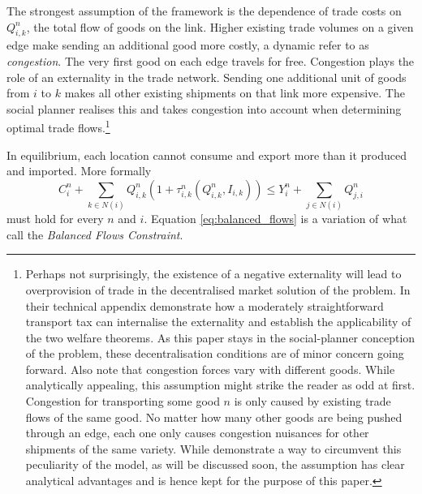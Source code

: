 \documentclass[11pt, oneside]{article}   	%
\begin{document}
The strongest assumption of the \citeauthor{Fajgelbaum_OptimalTransportNetworks_2017} framework is the dependence of trade costs on $Q_{i,k}^{n}$, the total flow of goods on the link. Higher existing trade volumes on a given edge make sending an additional good more costly, a dynamic \citeauthor{Fajgelbaum_OptimalTransportNetworks_2017} refer to as \emph{congestion}. The very first good on each edge travels for free. Congestion plays the role of an externality in the trade network. Sending one additional unit of goods from $i$ to $k$ makes all other existing shipments on that link more expensive. The social planner realises this and takes congestion into account when determining optimal trade flows.\footnote{Perhaps not surprisingly, the existence of a negative externality will lead to overprovision of trade in the decentralised market solution of the problem. In their technical appendix \citeauthor{Fajgelbaum_OptimalTransportNetworks_2017} demonstrate how a moderately straightforward transport tax can internalise the externality and establish the applicability of the two welfare theorems. As this paper stays in the social-planner conception of the problem, these decentralisation conditions are of minor concern going forward. Also note that congestion forces vary with different goods. While analytically appealing, this assumption might strike the reader as odd at first. Congestion for transporting some good $n$ is only caused by existing trade flows of the same good. No matter how many other goods are being pushed through an edge, each one only causes congestion nuisances for other shipments of the same variety. While \citeauthor{Fajgelbaum_OptimalTransportNetworks_2017} demonstrate a way to circumvent this peculiarity of the model, as will be discussed soon, the assumption has clear analytical advantages and is hence kept for the purpose of this paper.}

In equilibrium, each location cannot consume and export more than it produced and imported. More formally
\begin{equation}
  C_{i}^{n} + \sum_{k\in N(i)}^{}Q_{i,k}^{n}(1+\tau_{i,k}^{n}(Q_{i,k}^{n}, I_{i,k})) \leq Y_{i}^{n} + \sum_{j\in N(i)}^{}Q_{j,i}^{n}
  \label{eq:balanced_flows}
\end{equation}
must hold for every $n$ and $i$. Equation \eqref{eq:balanced_flows} is a variation of what \citeauthor{Fajgelbaum_OptimalTransportNetworks_2017} call the \emph{Balanced Flows Constraint}.
\end{document}
